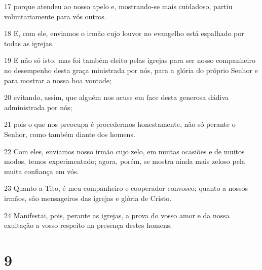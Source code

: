 \par 17 porque atendeu ao nosso apelo e, mostrando-se mais cuidadoso, partiu voluntariamente para vós outros.
\par 18 E, com ele, enviamos o irmão cujo louvor no evangelho está espalhado por todas as igrejas.
\par 19 E não só isto, mas foi também eleito pelas igrejas para ser nosso companheiro no desempenho desta graça ministrada por nós, para a glória do próprio Senhor e para mostrar a nossa boa vontade;
\par 20 evitando, assim, que alguém nos acuse em face desta generosa dádiva administrada por nós;
\par 21 pois o que nos preocupa é procedermos honestamente, não só perante o Senhor, como também diante dos homens.
\par 22 Com eles, enviamos nosso irmão cujo zelo, em muitas ocasiões e de muitos modos, temos experimentado; agora, porém, se mostra ainda mais zeloso pela muita confiança em vós.
\par 23 Quanto a Tito, é meu companheiro e cooperador convosco; quanto a nossos irmãos, são mensageiros das igrejas e glória de Cristo.
\par 24 Manifestai, pois, perante as igrejas, a prova do vosso amor e da nossa exultação a vosso respeito na presença destes homens.

\chapter{9}

